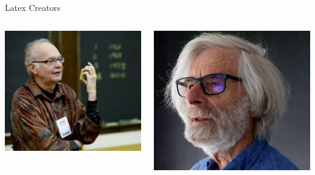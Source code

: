 \begin{frame}{Latex Creators}
    \begin{columns}
        \begin{column}{0.6\textwidth}
            \includegraphics[width=0.7\linewidth]{figs/knuth}
        \end{column}
        
        \begin{column}{0.5\textwidth}
            \includegraphics[width=0.9\linewidth]{figs/Lamport}
        \end{column}
    \end{columns}
\end{frame}



